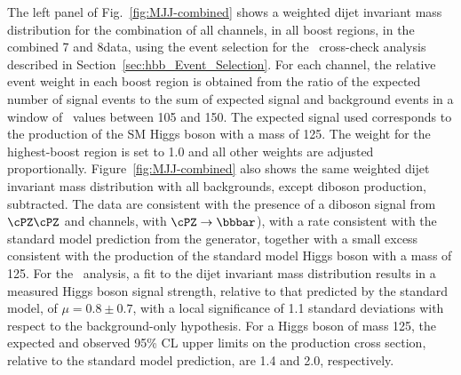 \documentclass[11pt,twoside,a4paper,cmspaper,final,collab]{cms-tdr}
\begin{document}
The left panel of Fig.~\ref{fig:MJJ-combined} shows a weighted dijet invariant mass distribution
for the combination of all channels, in all
boost regions, in the
combined 7 and 8\TeV data, using the event selection for the \Mjj\
cross-check analysis described in
Section~\ref{sec:hbb_Event_Selection}. For each channel, the relative
event weight in each boost region is obtained from the ratio of the expected number of
signal events to the sum of expected signal and background events in a
window of \Mjj\ values between 105 and 150\GeV. The expected signal
used corresponds to the production of the SM Higgs boson with a mass of
125\GeV. The weight for the
highest-boost region is set to 1.0 and all other weights are adjusted proportionally.
Figure~\ref{fig:MJJ-combined} also shows the same weighted
dijet invariant mass
distribution with all backgrounds, except diboson production, subtracted. The
data are consistent with the presence of a diboson signal from $\cPZ\cPZ$
and \WZ channels, with
$\cPZ\to \bbbar$), with a rate
consistent with the standard model prediction from the {\MADGRAPH}
generator, together with a
small excess consistent with the production
of the standard model Higgs boson with a mass of 125\GeV. For the \Mjj\ analysis, a
fit to the dijet invariant mass distribution results in a measured Higgs boson signal
strength, relative to that predicted by the standard model, of
$\mu = 0.8\pm 0.7$, with a local significance of 1.1 standard deviations
with respect to the background-only hypothesis.
For a Higgs boson of mass 125\GeV, the expected and observed 95\% CL upper limits
on the production cross section, relative to the standard model
prediction, are 1.4 and 2.0, respectively.
\end{document}
